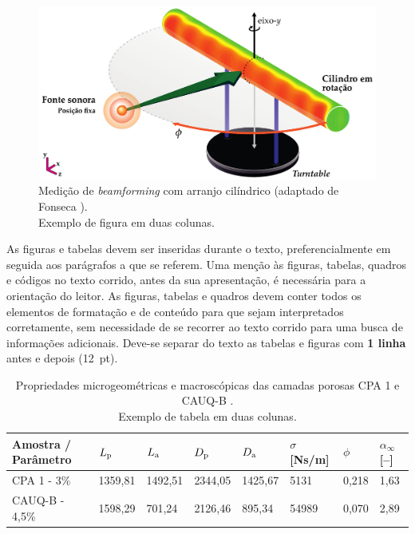 \begin{figure}[!t]
	\centering
	\includegraphics[width=0.74\linewidth]{Figuras/Measurement-Scheme-Fonseca-2013.pdf}%
	\caption{Medição de \textit{beamforming} com arranjo cilíndrico (adaptado de Fonseca \cite{Fonseca-2013}).\\ Exemplo de figura em duas colunas.}%
	\label{fig:beamforming}%
\end{figure}

As figuras e tabelas devem ser inseridas durante o texto, preferencialmente em seguida aos parágrafos a que se referem. Uma menção
às figuras, tabelas, quadros e códigos no texto corrido, antes da sua apresentação, é necessária para a orientação do leitor. As figuras, tabelas e quadros devem conter todos os elementos de formatação e de conteúdo para que sejam interpretados corretamente, sem necessidade de se recorrer ao texto corrido para uma busca de informações adicionais. Deve-se separar do texto as tabelas e figuras com \textbf{1 linha} antes e depois (12~pt). 


\begin{table}[!b]
  \centering {} 
  \caption{Propriedades microgeométricas e macroscópicas das camadas porosas CPA 1 e CAUQ-B \cite{Mareze-2017}.\\ Exemplo de tabela em duas colunas.}
	\fontsize{11}{12}\selectfont 
    \begin{tabular}{C{2.8cm} | C{1.5cm} | C{1.5cm} | C{1.5cm} | C{1.5cm} | C{1.5cm} | C{1.0cm}| C{1.0cm}}
    \toprule
    \textbf{ Amostra / Parâmetro } & $L_{\text{p}}$ \qquad [$\upmu$\! m] & $L_{\text{a}}$ \qquad [$\upmu$\! m] & $D_{\text{p}}$ \qquad [$\upmu$\! m] & $D_{\text{a}}$ \qquad [$\upmu$\! m] & $\sigma$ [Ns/m] & {$\phi$\quad [--]} & $\alpha_{\infty}$ [--]\\
	  \midrule
		CPA 1 -  3\% &	1359,81 & 1492,51 & 2344,05 & 1425,67 &	5131 &	0,218 &	1,63\\
		 CAUQ-B - 4,5\%	& 1598,29 &	701,24 & 2126,46 & 895,34 &	54989 &	0,070 &	2,89\\
    \bottomrule
    \end{tabular}
    \label{tab.exemplo}%
\end{table}%

